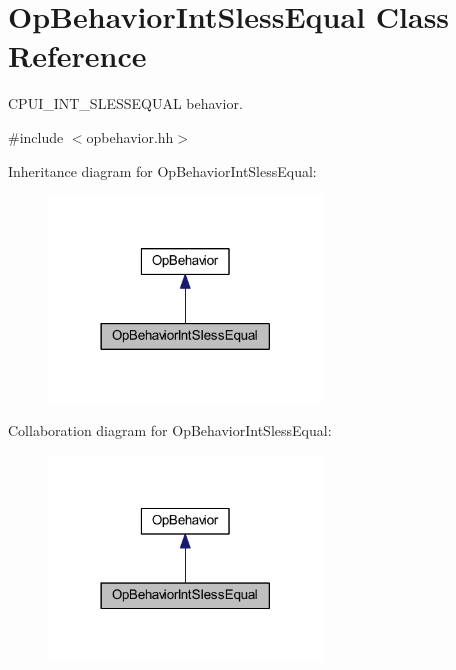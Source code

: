 \hypertarget{class_op_behavior_int_sless_equal}{}\section{Op\+Behavior\+Int\+Sless\+Equal Class Reference}
\label{class_op_behavior_int_sless_equal}


C\+P\+U\+I\+\_\+\+I\+N\+T\+\_\+\+S\+L\+E\+S\+S\+E\+Q\+U\+AL behavior.  




{\ttfamily \#include $<$opbehavior.\+hh$>$}



Inheritance diagram for Op\+Behavior\+Int\+Sless\+Equal\+:
\nopagebreak
\begin{figure}[H]
\begin{center}
\leavevmode
\includegraphics[width=206pt]{class_op_behavior_int_sless_equal__inherit__graph}
\end{center}
\end{figure}


Collaboration diagram for Op\+Behavior\+Int\+Sless\+Equal\+:
\nopagebreak
\begin{figure}[H]
\begin{center}
\leavevmode
\includegraphics[width=206pt]{class_op_behavior_int_sless_equal__coll__graph}
\end{center}
\end{figure}
